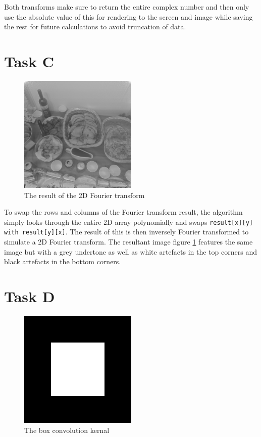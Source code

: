 \documentclass{article}
\begin{document}
Both transforms make sure to return the entire complex number and then only use the absolute value of this for rendering to the screen and image while saving the rest for future calculations to avoid truncation of data.

\section{Task C} \label{c}

\begin{figure}[h]
    \centering
    \caption{The result of the 2D Fourier transform}
    \label{fig:2d}
    \includegraphics[width=0.5\textwidth]{double_fourier_image.png}
\end{figure}

To swap the rows and columns of the Fourier transform result, the algorithm simply looks through the entire 2D array polynomially and swaps \verb|result[x][y] with result[y][x]|. The result of this is then inversely Fourier transformed to simulate a 2D Fourier transform. The resultant image figure \ref{fig:2d} features the same image but with a grey undertone as well as white artefacts in the top corners and black artefacts in the bottom corners.

\section{Task D} \label{d}

\begin{figure}[H]
    \centering
    \caption{The box convolution kernal}
    \label{fig:box}
    \includegraphics[width=0.5\textwidth]{rect_image.png}
\end{figure}
\end{document}

